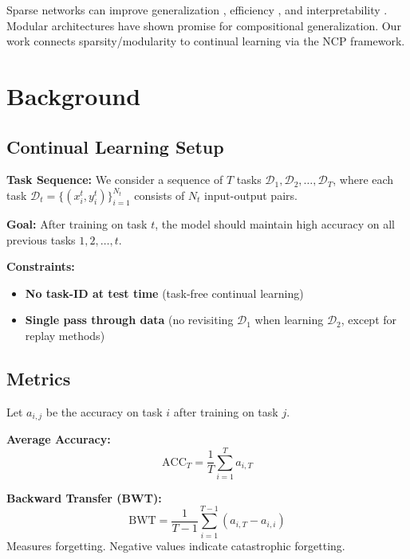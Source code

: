 \documentclass[11pt,twocolumn]{article}
\begin{document}
Sparse networks can improve generalization \cite{han2015deep}, efficiency \cite{molchanov2017variational}, and interpretability \cite{fong2018net2vec}. Modular architectures \cite{kirsch2018modular, goyal2021recurrent} have shown promise for compositional generalization. Our work connects sparsity/modularity to continual learning via the NCP framework.

\section{Background}

\subsection{Continual Learning Setup}

\textbf{Task Sequence:} We consider a sequence of $T$ tasks $\mathcal{D}_1, \mathcal{D}_2, \ldots, \mathcal{D}_T$, where each task $\mathcal{D}_t = \{(x_i^t, y_i^t)\}_{i=1}^{N_t}$ consists of $N_t$ input-output pairs.

\textbf{Goal:} After training on task $t$, the model should maintain high accuracy on all previous tasks $1, 2, \ldots, t$.

\textbf{Constraints:}
\begin{itemize}
    \item \textbf{No task-ID at test time} (task-free continual learning)
    \item \textbf{Single pass through data} (no revisiting $\mathcal{D}_1$ when learning $\mathcal{D}_2$, except for replay methods)
\end{itemize}

\subsection{Metrics}

Let $a_{i,j}$ be the accuracy on task $i$ after training on task $j$.

\textbf{Average Accuracy:}
\begin{equation}
    \text{ACC}_T = \frac{1}{T} \sum_{i=1}^{T} a_{i,T}
\end{equation}

\textbf{Backward Transfer (BWT):}
\begin{equation}
    \text{BWT} = \frac{1}{T-1} \sum_{i=1}^{T-1} (a_{i,T} - a_{i,i})
\end{equation}
Measures forgetting. Negative values indicate catastrophic forgetting.
\end{document}
